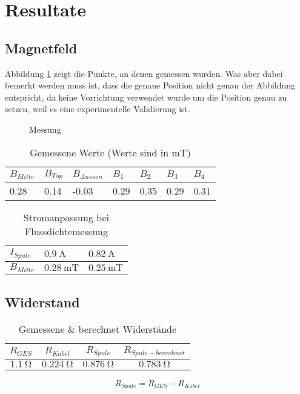 \documentclass[../main.tex]{subfiles}
\begin{document}
\section{Resultate}

\subsection{Magnetfeld}

Abbildung \ref{fig:how_it_was_measured} zeigt die Punkte, an denen gemessen wurden. Was aber dabei bemerkt werden muss ist, dass die genaue Position nicht genau der Abbildung entspricht, da keine Vorrichtung verwendet wurde um die Position genau zu setzen, weil es eine experimentelle Validierung ist.

\begin{figure}[h]
  \centering
  
  \caption{Messung}
  \label{fig:how_it_was_measured}
\end{figure}

\begin{table}[h]
  \centering
  \def\arraystretch{1.5}
  \begin{tabular}{l|l|l|l|l|l|l}
  $B_{Mitte}$ & $B_{Top}$ & $B_{Aussen}$ & $B_1$ & $B_2$ & $B_3$ & $B_4$ \\ \hline
  0.28         & 0.14       & -0.03         & 0.29   & 0.35   & 0.29   & 0.31  
  \end{tabular}
  \caption{Gemessene Werte (Werte sind in $\si{\milli\tesla}$)}
  \label{tab:measurement_results}
\end{table}

\begin{table}[h]
  \centering
  \def\arraystretch{1.5}
  \begin{tabular}{l|l|l}
  $I_{Spule}$ & $\SI{0.9}{\ampere}$       & $\SI{0.82}{\ampere}$ \\ \hline
  $B_{Mitte}$ & $\SI{0.28}{\milli\tesla}$ & $\SI{0.25}{\milli\tesla}$  
  \end{tabular}
  \caption{Stromanpassung bei Flussdichtemessung}
  \label{tab:adjustments_current}
\end{table}

\subsection{Widerstand}

\begin{table}[H]
  \centering
  \def\arraystretch{1.5}
  \begin{tabular}{c|c|c||c}
  $R_{GES}$        & $R_{Kabel}$        & $R_{Spule}$        & $R_{Spule-berechnet}$\\ \hline
  $\SI{1.1}{\ohm}$ & $\SI{0.224}{\ohm}$ & $\SI{0.876}{\ohm}$ & $\SI{0.783}{\ohm}$
  \end{tabular}
  \caption{Gemessene \& berechnet Widerstände}
  \label{tab:resistance_results}
\end{table}

\begin{equation}
  R_{Spule} = R_{GES} - R_{Kabel}
  \label{equ:calculate_wire_resistance}
\end{equation}

%   
\newpage
\end{document}
